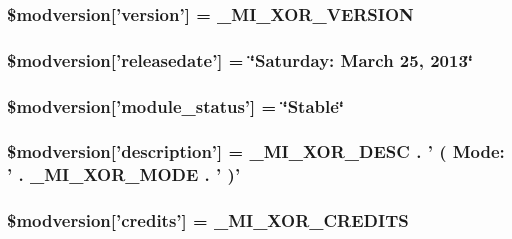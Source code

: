\hypertarget{xoops__version_8php_acca90d0d682b0eb029fdaad38ff16570}{
\subsubsection[{\$modversion}]{\setlength{\rightskip}{0pt plus 5cm}\$modversion\mbox{[}'version'\mbox{]} = {\bf \-\_\-\-M\-I\-\_\-\-X\-O\-R\-\_\-\-V\-E\-R\-S\-I\-O\-N}}}\label{xoops__version_8php_acca90d0d682b0eb029fdaad38ff16570}
\hypertarget{xoops__version_8php_a0155196723a439a1c9c63166d75e1aa9}{
\subsubsection[{\$modversion}]{\setlength{\rightskip}{0pt plus 5cm}\$modversion\mbox{[}'releasedate'\mbox{]} = \char`\"{}Saturday\-: March 25, 2013\char`\"{}}}\label{xoops__version_8php_a0155196723a439a1c9c63166d75e1aa9}
\hypertarget{xoops__version_8php_a9a8b63ec3546bbd06789015d8d641444}{
\subsubsection[{\$modversion}]{\setlength{\rightskip}{0pt plus 5cm}\$modversion\mbox{[}'module\-\_\-status'\mbox{]} = \char`\"{}Stable\char`\"{}}}\label{xoops__version_8php_a9a8b63ec3546bbd06789015d8d641444}
\hypertarget{xoops__version_8php_a3e2ba4037e62f8dd1790bdbde525315a}{
\subsubsection[{\$modversion}]{\setlength{\rightskip}{0pt plus 5cm}\$modversion\mbox{[}'description'\mbox{]} = {\bf \-\_\-\-M\-I\-\_\-\-X\-O\-R\-\_\-\-D\-E\-S\-C} . ' ( Mode\-: ' . \-\_\-\-M\-I\-\_\-\-X\-O\-R\-\_\-\-M\-O\-D\-E . ' )'}}\label{xoops__version_8php_a3e2ba4037e62f8dd1790bdbde525315a}
\hypertarget{xoops__version_8php_a959303c9b36209d115fdef00ee85b476}{
\subsubsection[{\$modversion}]{\setlength{\rightskip}{0pt plus 5cm}\$modversion\mbox{[}'credits'\mbox{]} = {\bf \-\_\-\-M\-I\-\_\-\-X\-O\-R\-\_\-\-C\-R\-E\-D\-I\-T\-S}}}\label{xoops__version_8php_a959303c9b36209d115fdef00ee85b476}
